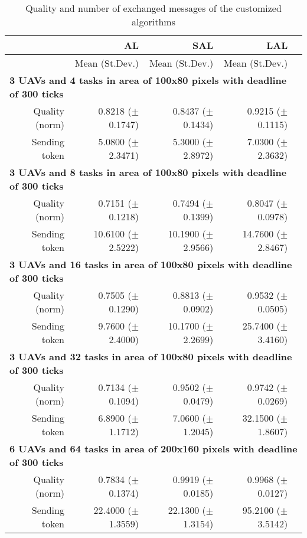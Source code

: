 \begin{table}%
	\small
	\fontsize{6}{6}\selectfont
	\centering
	\caption{Quality and number of exchanged messages of the customized algorithms}
	\label{table:table03}
	
	\begin{tabular}{rrrrr} \hline
		& AL
		& SAL
		& LAL \\ \hline 
		
		& Mean (St.Dev.)  & Mean (St.Dev.)  & Mean (St.Dev.)  \\ [1ex]
		
		\multicolumn{5}{l}{\textbf{3 UAVs and 4 tasks in area of 100x80 pixels with deadline of 300 ticks}} \\
	Quality (norm)         & 0.8218   ($\pm$0.1747)  &  0.8437  ($\pm$0.1434) & 0.9215  ($\pm$0.1115)   \\ 
	Sending token          &  5.0800  ($\pm$2.3471)  &  5.3000  ($\pm$2.8972) & 7.0300  ($\pm$2.3632)   \\ [1ex]
		
		\multicolumn{5}{l}{\textbf{3 UAVs and 8 tasks in area of 100x80 pixels with deadline of 300 ticks}} \\
	Quality (norm)         & 0.7151  ($\pm$0.1218)  & 0.7494  ($\pm$0.1399) &  0.8047  ($\pm$0.0978)  \\ 
	Sending token          & 10.6100 ($\pm$2.5222)  & 10.1900 ($\pm$2.9566) &  14.7600 ($\pm$2.8467)  \\ [1ex]
	
	    \multicolumn{5}{l}{\textbf{3 UAVs and 16 tasks in area of 100x80 pixels with deadline of 300 ticks}} \\
	Quality (norm)         & 0.7505  ($\pm$0.1290)  & 0.8813  ($\pm$0.0902) &  0.9532  ($\pm$0.0505)  \\ 
	Sending token          & 9.7600  ($\pm$2.4000)  & 10.1700 ($\pm$2.2699) &  25.7400 ($\pm$3.4160)  \\ [1ex]
	
	    \multicolumn{5}{l}{\textbf{3 UAVs and 32 tasks in area of 100x80 pixels with deadline of 300 ticks}} \\
	Quality (norm)         & 0.7134  ($\pm$0.1094)  & 0.9502  ($\pm$0.0479) &  0.9742  ($\pm$0.0269)  \\ 
	Sending token          & 6.8900  ($\pm$1.1712)  & 7.0600  ($\pm$1.2045) &  32.1500 ($\pm$1.8607)  \\ [1ex]
	
	    \multicolumn{5}{l}{\textbf{6 UAVs and 64 tasks in area of 200x160 pixels with deadline of 300 ticks}} \\
	Quality (norm)         & 0.7834  ($\pm$0.1374)  & 0.9919  ($\pm$0.0185) &  0.9968  ($\pm$0.0127)  \\ 
	Sending token          & 22.4000 ($\pm$1.3559)  & 22.1300 ($\pm$1.3154) &  95.2100 ($\pm$3.5142)  \\ [1ex]

		\hline
	\end{tabular}
\end{table} 




